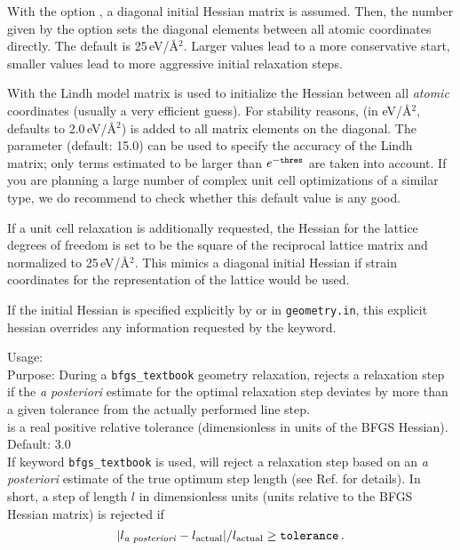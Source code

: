 With the option , a diagonal initial Hessian matrix is
assumed. Then, the number given by the  option sets the
diagonal elements between all atomic coordinates directly. The default
is 25\,eV/\AA$^2$. Larger values lead to a more conservative
start, smaller values lead to more aggressive initial relaxation steps.

With  the Lindh model matrix \cite{Lin95} is used to
initialize the Hessian between all \emph{atomic} coordinates (usually
a very efficient guess). For  stability reasons, 
(in eV/\AA$^2$, defaults to 2.0\,eV/\AA$^2$) is added to all matrix 
elements on the diagonal. The parameter  (default: 
15.0) can be used to specify the accuracy of the Lindh matrix; only
terms estimated to be larger than $e^{-\text{\texttt{thres}}}$ are
taken into account.   
If you are planning a large number of complex unit cell optimizations of
a similar type, we do recommend to check whether this default value is
any good. 

If a unit cell relaxation is additionally requested, 
the Hessian for the lattice degrees of 
freedom is set to be the square of the reciprocal lattice matrix and normalized to 
25\,eV/\AA$^2$. This mimics a diagonal initial Hessian if strain coordinates for the 
representation of the lattice would be used.~\cite{Pfrommer1997}
\newline

If the initial Hessian is specified explicitly by  or
 in \texttt{geometry.in}, this explicit hessian overrides
any information requested by the  keyword.


{
  \noindent
  Usage:   \\[1.0ex]
  Purpose: During a  \texttt{bfgs\_textbook} geometry
    relaxation, rejects a
    relaxation step if the \emph{a posteriori} estimate for the optimal
    relaxation step deviates by more than a given tolerance from the
    actually performed line step. \\[1.0ex]
   is a real positive relative tolerance
    (dimensionless in units of the BFGS Hessian). Default:
    3.0 \\ 
}
If keyword  \texttt{bfgs\_textbook} is used,
 will reject a relaxation step based on an
\emph{a posteriori} estimate of the true optimum step length (see 
Ref. \cite{Blum08} for details). In short, a step of length $l$ in
dimensionless units (units relative to the BFGS Hessian matrix) is
rejected if 
\begin{equation}
  |l_\text{\emph{a posteriori}} - l_\text{actual}|/l_\text{actual} \ge
   \mathtt{tolerance} \, .
\end{equation}

